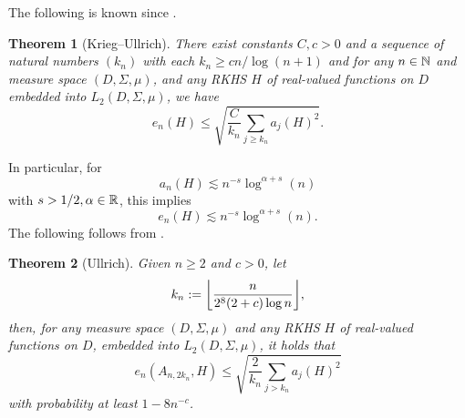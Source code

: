 \documentclass[12pt, oneside]{amsart}
\newtheorem{thm}{Theorem}[section]
\theoremstyle{definition}
\theoremstyle{remark}
\numberwithin{equation}{section}
\begin{document}
The following is known since \cite{Krieg_2020}.
\begin{thm}[Krieg--Ullrich]\label{thm:kriegUllrich2020}
    There exist constants \(C, c > 0\) and a sequence of natural numbers \((k_n)\) with each \(k_n \geq cn/\log(n+1)\) and for any \(n \in \mathbb{N}\) and measure space \((D, \Sigma, \mu)\), and any RKHS \(H\) of real-valued functions on \(D\) embedded into \(L_2(D, \Sigma, \mu)\), we have \[
        e_n(H) \leq \sqrt{\frac{C}{k_n} \sum_{j \geq k_n} a_j(H)^2}.
    \]
\end{thm}
In particular, for 
\begin{equation}\label{eq:orderOfApproximationNumbers}
    a_n(H) \lesssim n^{-s} \log^{\alpha + s}(n)
\end{equation}
with \(s > 1/2, \alpha \in \mathbb{R}\), this implies \[
    e_n(H) \lesssim n^{-s} \log^{\alpha+s}(n).
\]
The following follows from \cite{Ullrich_2020}.
\begin{thm}[Ullrich]
    Given \(n \geq 2\) and \(c > 0\), let \[
        k_n \defn \floor*{\frac{n}{2^8 (2+c) \log n}},
    \]
    then, for any measure space \((D, \Sigma, \mu)\) and any RKHS \(H\) of real-valued functions on \(D\), embedded into \(L_2(D, \Sigma, \mu)\), it holds that \[
        e_n\left(A_{n, 2 k_n}, H\right) \leq \sqrt{ \frac{2}{k_n} \sum_{j > k_n} a_j(H)^2 }
    \]
    with probability at least \(1-8n^{-c}\).
\end{thm}
\end{document}
